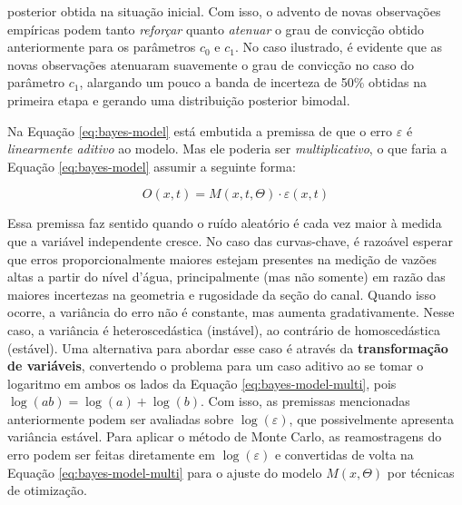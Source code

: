 \documentclass[./main.tex]{subfiles}
\begin{document}
posterior obtida na situação inicial. Com isso, o advento de novas observações empíricas podem tanto \textit{reforçar} quanto \textit{atenuar} o grau de convicção obtido anteriormente para os parâmetros $c_0$ e $c_1$. No caso ilustrado, é evidente que as novas observações atenuaram suavemente o grau de convicção no caso do parâmetro $c_1$, alargando um pouco a banda de incerteza de 50\% obtidas na primeira etapa e gerando uma distribuição posterior bimodal. 
\par Na Equação \eqref{eq:bayes-model} está embutida a premissa de que o erro $\varepsilon$ é \textit{linearmente aditivo} ao modelo. Mas ele poderia ser \textit{multiplicativo}, o que faria a Equação \eqref{eq:bayes-model} assumir a seguinte forma:
\begin{linenomath*}
\begin{equation}
\label{eq:bayes-model-multi}
    O(x, t) = M(x, t, \Theta) \cdot \varepsilon(x, t)
\end{equation}
\end{linenomath*}
Essa premissa faz sentido quando o ruído aleatório é cada vez maior à medida que a variável independente cresce. No caso das curvas-chave, é razoável esperar que erros proporcionalmente maiores estejam presentes na medição de vazões altas a partir do nível d'água, principalmente (mas não somente) em razão das maiores incertezas na geometria e rugosidade da seção do canal. Quando isso ocorre, a variância do erro não é constante, mas aumenta gradativamente. Nesse caso, a variância é heteroscedástica (instável), ao contrário de homoscedástica (estável). Uma alternativa para abordar esse caso é através da \textbf{transformação de variáveis}, convertendo o problema para um caso aditivo ao se tomar o logaritmo em ambos os lados da Equação \eqref{eq:bayes-model-multi}, pois $\log(ab) = \log(a) + \log(b)$. Com isso, as premissas  mencionadas anteriormente podem ser avaliadas sobre $\log(\varepsilon)$, que possivelmente apresenta variância estável. Para aplicar o método de Monte Carlo, as reamostragens do erro podem ser feitas diretamente em $\log(\varepsilon)$ e convertidas de volta na Equação \eqref{eq:bayes-model-multi} para o ajuste do modelo $M(x, \Theta)$ por técnicas de otimização.
\end{document}
